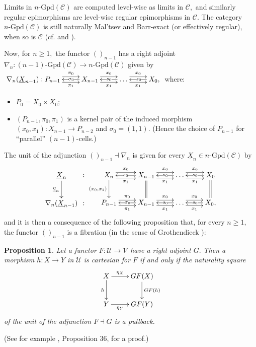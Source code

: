 \documentclass[11pt]{amsart}
\theoremstyle{plain}
\newtheorem{proposition}[subsubsection]{Proposition}
\theoremstyle{definition}
\theoremstyle{remark}
\begin{document}
Limits in $n\text{-}\mathrm{Gpd}(\mathcal{C})$ are computed level-wise as limits in $\mathcal{C},$ and similarly regular epimorphisms are level-wise regular epimorphisms in $\mathcal{C}.$ The category $n\text{-}\mathrm{Gpd}(\mathcal{C})$ is still naturally Mal'tsev and Barr-exact (or effectively regular), when so is $\mathcal{C}$ (cf. \cite{bourn-rodelo} and \cite{gran}).

Now, for $n\geq 1,$ the functor $()_{n-1}$ has a right adjoint $\nabla_n\colon(n-1)\text{-}\mathrm{Gpd}(\mathcal{C})\rightarrow n\text{-}\mathrm{Gpd}(\mathcal{C})$ given by $\xymatrix{
{\nabla_n(\underline{X}_{n-1}):P_{n-1}} \ar@<.9ex>[r]^-{\pi_0} \ar@<-.9ex>[r]_-{\pi_1} &{X_{n-1}} \ar[l]|(.33){\sigma_0} \ar@<.9ex>[r]^-{x_0} \ar@<-.9ex>[r]_-{x_1} &{\dots} \ar[l]|(.43){s_0} \ar@<.9ex>[r]^-{x_0} \ar@<-.9ex>[r]_-{x_1} &{X_0,} \ar[l]|{s_0}
}$ where:
\begin{itemize}
\item $P_0=X_0\times X_0;$
\item $(P_{n-1},\pi_0,\pi_1)$ is a kernel pair of the induced morphism $(x_0,x_1)\colon X_{n-1}\longrightarrow P_{n-2}$ and $\sigma_0=(1,1).$ (Hence the choice of $P_{n-1}$ for ``parallel'' $(n-1)$-cells.)
\end{itemize}
The unit of the adjunction $()_{n-1}\dashv\nabla_n$ is given for every $\underline{X}_n\in n\text{-}\mathrm{Gpd}(\mathcal{C})$ by
\begin{equation}
\begin{aligned}
\label{eqn:eta_n}
{
\xymatrixcolsep{0.1pc}
\xymatrix{
{\underline{X}_n} \ar[d]_-{\underline{\eta}_n} &{:}\\
{\nabla_n(\underline{X}_{n-1})} &{:}
}
}
{
\xymatrix{
{X_n} \ar[d]_-{(x_0,x_1)} \ar@<.9ex>[r]^-{x_0} \ar@<-.9ex>[r]_-{x_1} &{X_{n-1}} \ar@{=}[d] \ar[l]|(.55){s_0} \ar@<.9ex>[r]^-{x_0} \ar@<-.9ex>[r]_-{x_1} &{\dots} \ar[l]|(.43){s_0} \ar@<.9ex>[r]^-{x_0} \ar@<-.9ex>[r]_-{x_1} &{X_0} \ar@{=}[d] \ar[l]|{s_0} \\
{P_{n-1}} \ar@<.9ex>[r]^-{\pi_0} \ar@<-.9ex>[r]_-{\pi_1} &{X_{n-1}} \ar[l]|{\sigma_0} \ar@<.9ex>[r]^-{x_0} \ar@<-.9ex>[r]_-{x_1} &{\dots} \ar[l]|(.43){s_0} \ar@<.9ex>[r]^-{x_0} \ar@<-.9ex>[r]_-{x_1} &{X_0,} \ar[l]|{s_0}
}
}
\end{aligned}
\end{equation}
and it is then a consequence of the following proposition that, for every $n\geq 1,$ the functor $()_{n-1}$ is a fibration (in the sense of Grothendieck \cite[VI]{sga1}):
\begin{proposition}
Let a functor $F\colon\mathcal{U}\rightarrow\mathcal{V}$ have a right adjoint $G.$ Then a morphism $h\colon X\rightarrow Y$ in $\mathcal{U}$ is cartesian for $F$ if and only if the naturality square
\[
\xymatrix{
X \ar[d]_-h \ar[r]^-{\eta_X} &{GF(X)} \ar[d]^-{GF(h)} \\
Y \ar[r]_-{\eta_Y} &{GF(Y)}
}
\]
of the unit of the adjunction $F\dashv G$ is a pullback.
\end{proposition}
(See for example \cite{BCGS}, Proposition 36, for a proof.)
\end{document}
